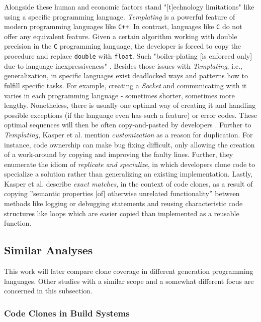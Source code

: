 Alongside these human and economic factors stand "[t]echnology limitations" \cite{kasper2006cloning} like using a specific programming language.
\textit{Templating} is a powerful feature of modern programming languages like \texttt{C++}. In contrast, languages like \texttt{C} do not offer any equivalent feature.
Given a certain algorithm working with double precision in the \texttt{C} programming language, the developer is forced to copy the procedure and replace \texttt{double} with \texttt{float}. Such "boiler-plating [is enforced only] due to language inexpressiveness" \cite{kasper2006cloning}. 
Besides those issues with \textit{Templating}, i.e., generalization, in specific languages exist deadlocked ways and patterns how to fulfill specific tasks.
For example, creating a \textit{Socket} and communicating with it varies in each programming language - sometimes shorter, sometimes more lengthy. Nonetheless, there is usually one optimal way of creating it and handling possible exceptions (if the language even has such a feature) or error codes. 
These optimal sequences will then be often copy-and-pasted by developers \cite{kasper2006cloning}.
Further to \textit{Templating}, Kasper et al.  \cite{kasper2006cloning} mention \textit{customization} as a reason for duplication.
For instance, code ownership can make bug fixing difficult, only allowing the creation of a work-around by copying and improving the faulty lines.
Further, they enumerate the idiom of \textit{replicate and specialize}, in which developers clone code to specialize a solution rather than generalizing an existing implementation.
Lastly, Kasper et al. \cite{kasper2006cloning} describe \textit{exact matches}, in the context of code clones, as a result of copying ”semantic properties [of] otherwise unrelated functionality” \cite{kasper2006cloning} between methods like logging or debugging statements and reusing characteristic code structures like loops which are easier copied than implemented as a reusable function.

\subsection{Similar Analyses}
\label{sec:similiar_analyses}

This work will later compare clone coverage in different generation programming languages. Other studies with a similar scope and a somewhat different focus are concerned in this subsection.

\subsubsection{Code Clones in Build Systems}

